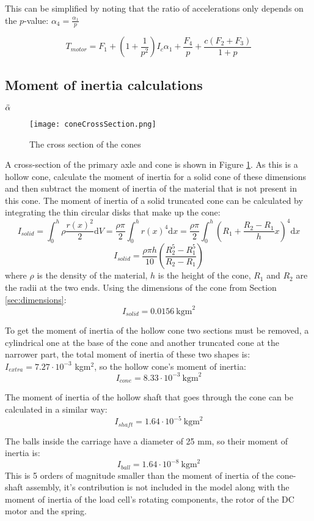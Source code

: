 \documentclass[12pt]{article}
\begin{document}
This can be simplified by noting that the ratio of accelerations only depends on the $p$-value: $\alpha_4 = \frac{\alpha_1}{p}$

$$T_{motor} = F_1 + \left(1+\frac{1}{p^2}\right)I_c\alpha_1 + \frac{F_4 }{p} + \frac{c(F_2+F_3)}{1+p}$$



\subsection{Moment of inertia calculations}

$\Ddot{\alpha}$

\begin{figure}[h]
    \centering
    \texttt{[image: coneCrossSection.png]}
    \caption{The cross section of the cones}
    \label{fig:coneCrossSection}
\end{figure}

A cross-section of the primary axle and cone is shown in Figure \ref{fig:coneCrossSection}. As this is a hollow cone, calculate the moment of inertia for a solid cone of these dimensions and then subtract the moment of inertia of the material that is not present in this cone.
The moment of inertia of a solid truncated cone can be calculated by integrating the thin circular disks that make up the cone:
$$I_{solid} = \int_0^h \rho \frac{r(x)^2}{2} \text{d}V = \frac{\rho \pi }{2} \int_0^h r(x)^4 \text{d}x =\frac{\rho \pi }{2} \int_0^h \left( R_1 + \frac{R_2-R_1}{h}x \right)^4 \text{d}x $$
$$I_{solid} = \frac{\rho \pi h }{10}\left( \frac{R_2^5-R_1^5}{R_2-R_1}\right)$$
where $\rho$ is the density of the material, $h$ is the height of the cone, $R_1$ and $R_2$ are the radii at the two ends. Using the dimensions of the cone from Section \ref{sec:dimensions}:
$$I_{solid} = 0.0156~\text{kgm}^2$$

To get the moment of inertia of the hollow cone two sections must be removed, a cylindrical one at the base of the cone and another truncated cone at the narrower part, the total moment of inertia of these two shapes is: $I_{extra} = 7.27\cdot 10^{-3}$ kgm$^2$, so the hollow cone's moment of inertia:
$$I_{cone} = 8.33\cdot 10^{-3}~\text{kgm}^2$$

The moment of inertia of the hollow shaft that goes through the cone can be calculated in a similar way: 
$$I_{shaft} = 1.64\cdot 10^{-5}~\text{kgm}^2$$ 

The balls inside the carriage have a diameter of 25 mm, so their moment of inertia is:
$$I_{ball} = 1.64\cdot 10^{-8}~\text{kgm}^2$$
This is 5 orders of magnitude smaller than the moment of inertia of the cone-shaft assembly, it's contribution is not included in the model along with the moment of inertia of the load cell's rotating components, the rotor of the DC motor and the spring.
\end{document}

